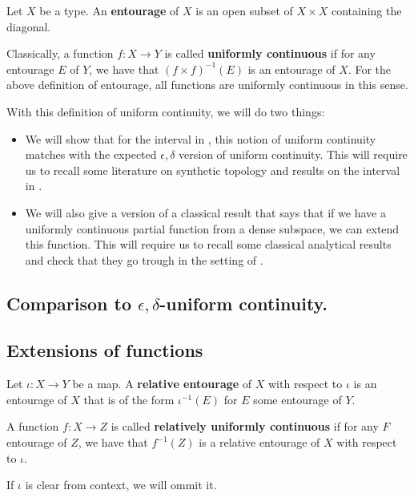 \begin{definition}
  Let $X$ be a type. An \textbf{entourage} of $X$ is an open subset of $X\times X$ containing the diagonal. 
\end{definition}

\begin{remark}
  Classically, a function $f:X \to Y$ is called \textbf{uniformly continuous} if for any entourage $E$ of $Y$, we have that $(f\times f)^{-1}(E)$ is an entourage of $X$. For the above definition of entourage, all functions are uniformly continuous in this sense. 
\end{remark}

With this definition of uniform continuity, we will do two things:
\begin{itemize}
  \item We will show that for the interval in \cite{synthetic-stone-duality}, this notion of uniform continuity matches with the expected $\epsilon,\delta$ version of uniform continuity. This will require us to recall some literature on synthetic topology and results on the interval in \cite{synthetic-stone-duality}. 
  \item We will also give a version of a classical result that says that if we have a uniformly continuous partial function from a dense subspace, we can extend this function. This will require us to recall some classical analytical results and check that they go trough in the setting of \cite{synthetic-stone-duality}. 
\end{itemize}
\subsection{Comparison to $\epsilon,\delta$-uniform continuity. }

\subsection{Extensions of functions}
\begin{definition}
  Let $\iota : X \to Y$ be a map. A \textbf{relative entourage} of $X$ with respect to $\iota$ is an entourage of $X$ that is of the form $\iota^{-1}(E)$ for $E$ some entourage of $Y$. 

  A function $f: X \to Z$ is called \textbf{relatively uniformly continuous} if for any $F$ entourage of $Z$, we have that $f^{-1}(Z)$ is a relative entourage of $X$ with respect to $\iota$. 

  If $\iota$ is clear from context, we will ommit it. 
\end{definition}

